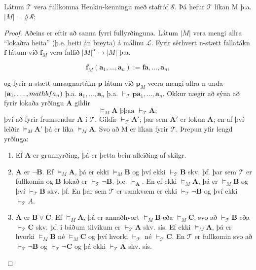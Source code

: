 \documentclass[12pt]{book}
\begin{document}
\begin{setn}
  Látum $\mathcal{T}$ vera fullkomna Henkin-kenningu
  með stafróf $\mathcal{S}$. Þá hefur $\mathcal{T}$ líkan M
  þ.a. $|M| = \#\mathcal{S}$;

  \begin{proof}
    Aðeins er eftir að sanna fyrri fullyrðinguna.
    Látum $|M|$ vera mengi allra ``lokaðra heita'' (þ.e. heiti án breyta) á málinu
    $\mathcal{L}$. Fyrir sérhvert n-stætt fallatákn $\mathbf{f}$
    látum við $\mathbf{f}_M$ vera fallið $|M|^{\alpha} \rightarrow |M|$
    þ.a.

    \[\mathbf{f}_M ( \mathbf{a}_1, \dotsc,\mathbf{a}_n ) := \mathbf{f} \mathbf{a}, \dotsc, \mathbf{a}_n ,\]
    
    og fyrir n-stætt umsagnartákn $\mathbf{p}$ látum við $\mathbf{p}_M$ veera mengi allra
    n-unda $(\mathbf{a}_1, \dotsc, \\mathbf{a}_n)$ þ.a. 
    \(\mathbf{a}_1, \dotsc, \mathbf{a}_n \)
    þ.a. $\vdash_{\mathcal{T}} \mathbf{p} \mathbf{a}_1, \dotsc, \mathbf{a}_n$.
    Okkur nægir að sýna að fyrir lokaða yrðingu $\mathbf{A}$ gildir
    \[ \models_M \mathbf{A} \text{ þþaa } \vdash_{\mathcal{T}} \mathbf{A}; \]
    því að fyrir frumsendur $\mathbf{A}$ í $\mathcal{T}$. 
    Gildir $\vdash_{\mathcal{T}} \mathbf{A}'$; þar sem $\mathbf{A}'$ er lokun
    $\mathbf{A}$; en af því leiðir $\models_M \mathbf{A}'$ þá er líka $\models_M \mathbf{A}$.
    Svo að M er líkan fyrir $\mathcal{T}$. Þrepun yfir lengd yrðinga:
    \begin{enumerate}[(1)]
    \item Ef $\mathbf{A}$ er grunnyrðing, þá er þetta bein afleiðing af skilgr.
    \item $\mathbf{A}$ er $\lnot \mathbf{B}$. Ef $\models_M \mathbf{A}$, þá er ekki
      $\models_M \mathbf{B}$ og því ekki $\vdash_{\mathcal{T}} \mathbf{B}$ skv. þf.
      þar sem $\mathcal{T}$ er fullkomin og $\mathbf{B}$ lokað er
      $\vdash_{\mathcal{T}} \lnot \mathbf{B}$, þ.e. $\vdash_{\mathbf{A}}$. En ef
      ekki $\models_{M} \mathbf{A}$, þá er $\models_M \mathbf{B}$ og því
      $\vdash_{\mathcal{T}} \mathbf{B}$ skv. þf. En þar sem $\mathcal{T}$ er 
      samkvæm er ekki $\vdash_{\mathcal{T}} \lnot \mathbf{B}$ og því ekki
      $\vdash_{\mathcal{T}} A$.
    \item $\mathbf{A}$ er $\mathbf{B} \vee \mathbf{C}$: Ef $\models_M \mathbf{A}$,
      þá er annaðhvort $\models_M \mathbf{B}$ eða $\models_M \mathbf{C}$,
      svo að $\vdash_{\mathcal{T}} \mathbf{B}$ eða $\vdash_{\mathcal{T}} \mathbf{C}$ skv. þf.
      í báðum tilvikum er $\vdash_{\mathcal{T}} \mathbf{A}$ skv. sís.
      Ef ekki $\models_M \mathbf{A}$, þá er hvorki $\models_M \mathbf{B}$
      né $\models_M \mathbf{C}$ og því hvorki $\vdash_{\mathcal{T}}$ né 
      $\vdash_{\mathcal{T}} \mathbf{C}$.
      En $\mathcal{T}$ er fullkomin svo að $\vdash_{\mathcal{T}} \lnot \mathbf{B}$ 
      og $\vdash_{\mathcal{T}} \lnot \mathbf{C}$ og þá ekki $\vdash_{\mathcal{T}} \mathbf{A}$ skv. sís.


\end{enumerate}
\end{proof}
\end{setn}
\end{document}
